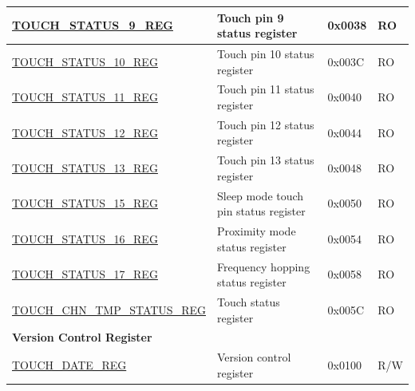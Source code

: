 \begin{longtable}{ | l | p{7.2cm} | p{1.3cm} | p{1.7cm} | }
\hyperref[regdesc:TOUCHSTATUS0REG]{TOUCH\_STATUS\_9\_REG} & Touch pin 9 status register & 0x0038 & RO \\ \hline
\hyperref[regdesc:TOUCHSTATUS0REG]{TOUCH\_STATUS\_10\_REG} & Touch pin 10 status register & 0x003C & RO \\ \hline
\hyperref[regdesc:TOUCHSTATUS0REG]{TOUCH\_STATUS\_11\_REG} & Touch pin 11 status register & 0x0040 & RO \\ \hline
\hyperref[regdesc:TOUCHSTATUS0REG]{TOUCH\_STATUS\_12\_REG} & Touch pin 12 status register & 0x0044 & RO \\ \hline
\hyperref[regdesc:TOUCHSTATUS0REG]{TOUCH\_STATUS\_13\_REG} & Touch pin 13 status register & 0x0048 & RO \\ \hline
\hyperref[regdesc:TOUCHSTATUS15REG]{TOUCH\_STATUS\_15\_REG} & Sleep mode touch pin status register & 0x0050 & RO \\ \hline
\hyperref[regdesc:TOUCHSTATUS16REG]{TOUCH\_STATUS\_16\_REG} & Proximity mode status register & 0x0054 & RO \\ \hline
\hyperref[regdesc:TOUCHSTATUS17REG]{TOUCH\_STATUS\_17\_REG} & Frequency hopping status register & 0x0058 & RO \\ \hline
\hyperref[regdesc:TOUCHCHNTMPSTATUSREG]{TOUCH\_CHN\_TMP\_STATUS\_REG} & Touch status register & 0x005C & RO \\ \hline
\multicolumn{4}{|l|}{\textbf{Version Control Register}} \\ \hline
\hyperref[regdesc:TOUCHDATEREG]{TOUCH\_DATE\_REG} & Version control register & 0x0100 & R/W \\ \hline
\end{longtable}
